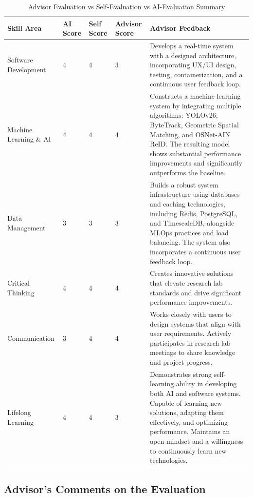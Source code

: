 \begin{table}[H]
    \centering
    \small
    \begin{tabularx}{\textwidth}{|p{2.6cm}|p{1.0cm}|p{1.0cm}|p{1.5cm}|X|}
        \hline
        \textbf{Skill Area} & \textbf{AI Score} & \textbf{Self Score} & \textbf{Advisor Score}& \textbf{Advisor Feedback} \\
        \hline
        Software Development & 4 & 4 & 3 & Develops a real-time system with a designed architecture, incorporating UX/UI design, testing, containerization, and a continuous user feedback loop. \\
        \hline
        Machine Learning \& AI & 4 & 4 & 4 & Constructs a machine learning system by integrating multiple algorithms: YOLOv26, ByteTrack, Geometric Spatial Matching, and OSNet-AIN ReID. The resulting model shows substantial performance improvements and significantly outperforms the baseline. \\
        \hline
        Data Management & 3 & 3 & 3 & Builds a robust system infrastructure using databases and caching technologies, including Redis, PostgreSQL, and TimescaleDB, alongside MLOps practices and load balancing. The system also incorporates a continuous user feedback loop. \\
        \hline
        Critical Thinking & 4 & 4 & 4 & Creates innovative solutions that elevate research lab standards and drive significant performance improvements. \\
        \hline
        Communication & 3 & 4 & 4 & Works closely with users to design systems that align with user requirements. Actively participates in research lab meetings to share knowledge and project progress. \\
        \hline
        Lifelong Learning & 4 & 4 & 3 & Demonstrates strong self-learning ability in developing both AI and software systems. Capable of learning new solutions, adapting them effectively, and optimizing performance. Maintains an open mindset and a willingness to continuously learn new technologies. \\
        \hline
    \end{tabularx}
    \caption{Advisor Evaluation vs Self-Evaluation vs AI-Evaluation Summary}
\end{table}

\subsection{Advisor’s Comments on the Evaluation}

